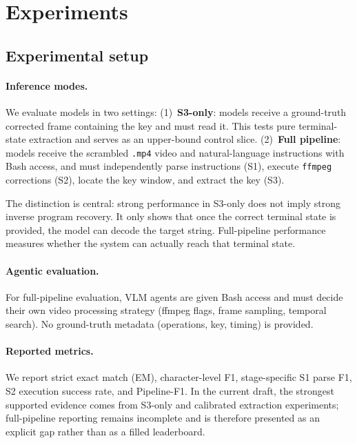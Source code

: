 \section{Experiments}
\label{sec:experiments}

\subsection{Experimental setup}

\paragraph{Inference modes.}
We evaluate models in two settings:
(1)~\textbf{S3-only}: models receive a ground-truth corrected frame containing
the key and must read it. This tests pure terminal-state extraction and serves
as an upper-bound control slice.
(2)~\textbf{Full pipeline}: models receive the scrambled \texttt{.mp4} video
and natural-language instructions with Bash access, and must independently
parse instructions (S1), execute \texttt{ffmpeg} corrections (S2), locate the
key window, and extract the key (S3).

The distinction is central: strong performance in S3-only does not imply strong
inverse program recovery. It only shows that once the correct terminal state is
provided, the model can decode the target string. Full-pipeline performance
measures whether the system can actually reach that terminal state.

\paragraph{Agentic evaluation.}
For full-pipeline evaluation, VLM agents are given Bash access and must decide
their own video processing strategy (ffmpeg flags, frame sampling, temporal
search). No ground-truth metadata (operations, key, timing) is provided.

\paragraph{Reported metrics.}
We report strict exact match (EM), character-level F1, stage-specific
S1 parse F1, S2 execution success rate, and Pipeline-F1. In the current draft,
the strongest supported evidence comes from S3-only and calibrated extraction
experiments; full-pipeline reporting remains incomplete and is therefore
presented as an explicit gap rather than as a filled leaderboard.

